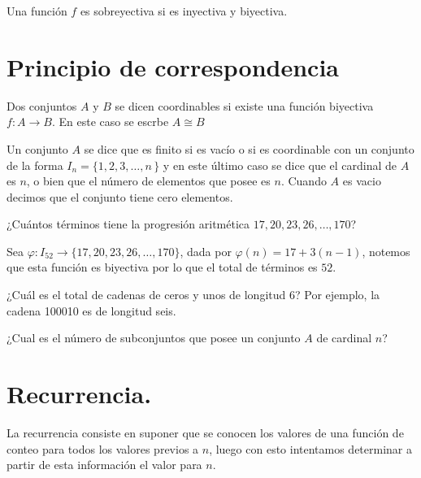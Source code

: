 \begin{definicion}[Biyectividad]
Una función $f$ es sobreyectiva si es inyectiva y biyectiva.
\end{definicion}

\section{Principio de correspondencia}

\begin{definicion}
Dos conjuntos $A$ y $B$ se dicen coordinables si existe una función biyectiva $f: A\to B$. En este caso se escrbe $A \cong B$
\end{definicion}

\begin{definicion}
Un conjunto $A$ se dice que es finito si es vacío o si es coordinable con un conjunto de la forma $I_n=\{1,2,3,\dots, n\,\}$ y en este último caso se dice que el cardinal de $A$ es $n$, o bien que el número de elementos que posee es $n$. Cuando $A$ es vacio decimos que el conjunto tiene cero elementos.
\end{definicion}

\begin{problema}
¿Cuántos términos tiene la progresión aritmética $17, 20, 23, 26, \dots, 170$?
\end{problema}

\begin{solucion}
Sea $\varphi : I_{52} \longrightarrow \{17, 20, 23, 26, \dots, 170\}$, dada por $\varphi(n)=17+3(n-1)$, notemos que esta función es biyectiva por lo que el total de términos es $52$.
\end{solucion}

\begin{ejercicio}
¿Cuál es el total de cadenas de ceros y unos de longitud 6? Por ejemplo, la cadena 100010 es de longitud seis.
\end{ejercicio}

\begin{ejercicio}
¿Cual es el número de subconjuntos que posee un conjunto $A$ de cardinal $n$?
\end{ejercicio}

\section{Recurrencia.}

La recurrencia consiste en suponer que se conocen los valores de una función de conteo para todos los valores previos a $n$, luego con esto intentamos determinar a partir de esta información el valor para $n$.

